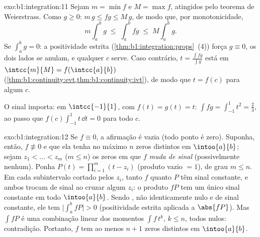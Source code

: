 \begin{solution}{exo:b1:integration:11}
Sejam $m = \min f$ e $M = \max f$, atingidos pelo teorema de
Weierstrass. Como $g \geq 0$: $m\,g \leq fg \leq M\,g$, de modo que, por
monotonicidade,
\[
m \int_a^b g \;\leq\; \int_a^b fg \;\leq\; M \int_a^b g .
\]
Se $\int_a^b g = 0$: a positividade estrita
(\cref{thm:b1:integration:props}~(4)) força $g \equiv 0$, os dois
lados se anulam, e qualquer $c$ serve. Caso contrário, $t = \frac{\int
fg}{\int g}$ está em $\intcc{m}{M} = f(\intcc{a}{b})$
(\cref{thm:b1:continuity:evt,thm:b1:continuity:ivt}), de modo que $t =
f(c)$ para algum $c$.

O sinal importa: em $\intcc{-1}{1}$, com $f(t) = g(t) = t$: $\int
fg = \int_{-1}^1 t^2 = \frac23$, ao passo que $f(c)\int_{-1}^1 t\,\dd t
= 0$ para todo $c$.
\end{solution}

\begin{solution}{exo:b1:integration:12}
Se $f \equiv 0$, a afirmação é vazia (todo ponto é zero). Suponha, então,
$f \not\equiv 0$ e que ela tenha no máximo $n$ zeros distintos
em $\intoo{a}{b}$; sejam $z_1 < \dots < z_m$ ($m \leq n$) os
zeros em que $f$ \emph{muda de sinal} (possivelmente nenhum). Ponha
$P(t) = \prod_{i=1}^{m}(t - z_i)$ (produto vazio $= 1$), de
grau $m \leq n$. Em cada subintervalo cortado pelos $z_i$, tanto
$f$ quanto $P$ têm sinal constante, e ambos trocam de sinal ao cruzar
algum $z_i$: o produto $fP$ tem um único sinal constante em todo
$\intoo{a}{b}$. Sendo , não identicamente nulo e de
sinal constante, ele tem $\bigl|\int_a^b fP\bigr| > 0$ (positividade
estrita aplicada a $\abs{fP}$). Mas $\int f P$ é uma combinação
linear dos momentos $\int f\,t^k$, $k \leq n$, todos nulos:
contradição. Portanto, $f$ tem ao menos $n + 1$ zeros distintos em
$\intoo{a}{b}$.
\end{solution}

